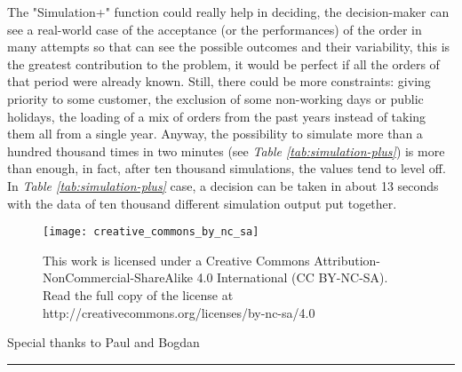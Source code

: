 \documentclass[a4paper,12pt]{article}
\begin{document}
The "Simulation+" function could really help in deciding, the decision-maker can see a real-world case of the acceptance (or the performances) of the order in many attempts so that can see the possible outcomes and their variability, this is the greatest contribution to the problem, it would be perfect if all the orders of that period were already known. Still, there could be more constraints: giving priority to some customer, the exclusion of some non-working days or public holidays, the loading of a mix of orders from the past years instead of taking them all from a single year.  Anyway, the possibility to simulate more than a hundred thousand times in two minutes (see \textit{Table \ref{tab:simulation-plus}}) is more than enough, in fact, after ten thousand simulations, the values tend to level off. In \textit{Table \ref{tab:simulation-plus}} case, a decision can be taken in about 13 seconds with the data of ten thousand different simulation output put together.


\newpage
\thispagestyle{empty}
\begin{figure*}[!b]
	\centering
   	 \texttt{[image: creative\_commons\_by\_nc\_sa]}
	\caption*{This work is licensed under a Creative Commons Attribution-NonCommercial-ShareAlike 4.0 International (CC BY-NC-SA).\\Read the full copy of the license at http://creativecommons.org/licenses/by-nc-sa/4.0}
\end{figure*}
\vspace*{\fill}
\centering\footnotesize{Special thanks to Paul and Bogdan}
\par\noindent\rule{\textwidth}{0.4pt}
\end{document}
